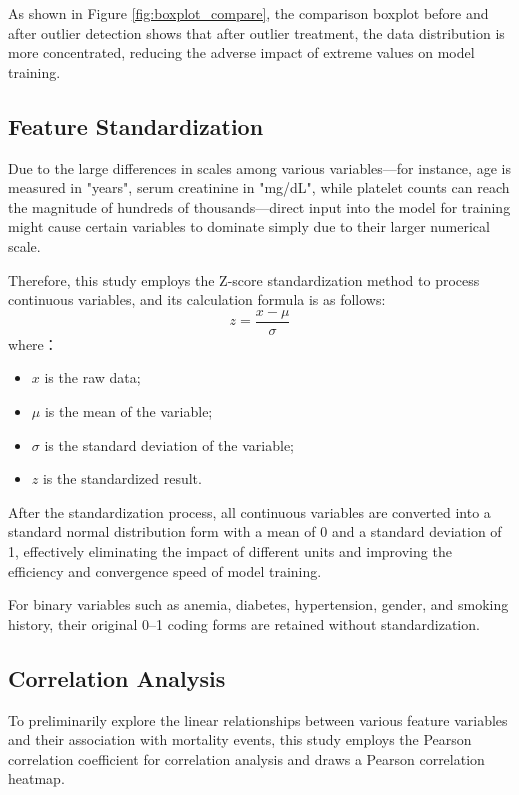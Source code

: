 \documentclass[11pt,a4paper]{article}
\begin{document}
As shown in Figure \ref{fig:boxplot_compare}, the comparison boxplot before and after outlier detection shows that after outlier treatment, the data distribution is more concentrated, reducing the adverse impact of extreme values on model training.

\subsection{Feature Standardization}

Due to the large differences in scales among various variables—for instance, age is measured in "years", serum creatinine in "mg/dL", while platelet counts can reach the magnitude of hundreds of thousands—direct input into the model for training might cause certain variables to dominate simply due to their larger numerical scale.

Therefore, this study employs the Z-score standardization method to process continuous variables, and its calculation formula is as follows:
\begin{equation}
z=\frac{x-\mu}{\sigma}
\end{equation}
where：
\begin{itemize}
    \item $x$ is the raw data;
    \item $\mu$ is the mean of the variable;
    \item $\sigma$ is the standard deviation of the variable;
    \item $z$ is the standardized result.
\end{itemize}

After the standardization process, all continuous variables are converted into a standard normal distribution form with a mean of 0 and a standard deviation of 1, effectively eliminating the impact of different units and improving the efficiency and convergence speed of model training.

For binary variables such as anemia, diabetes, hypertension, gender, and smoking history, their original 0--1 coding forms are retained without standardization.

\subsection{Correlation Analysis}

To preliminarily explore the linear relationships between various feature variables and their association with mortality events, this study employs the Pearson correlation coefficient for correlation analysis and draws a Pearson correlation heatmap.
\end{document}
